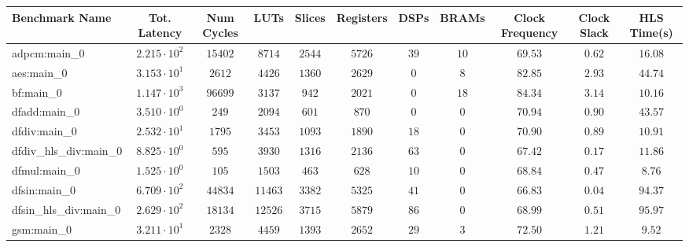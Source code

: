\begin{tabular}{|l|c|c|c|c|c|c|c|c|c|c|}
\hline
Benchmark Name          & Tot. Latency           & Num Cycles & LUTs      & Slices    & Registers & DSPs    & BRAMs   & Clock Frequency & Clock Slack & HLS Time(s) \\
\hline
adpcm:main\_0           & $ 2.215 \cdot 10^{2} $ & $ 15402  $ & $ 8714  $ & $ 2544  $ & $ 5726  $ & $ 39  $ & $ 10  $ & $ 69.53       $ & $ 0.62    $ & $ 16.08   $ \\
aes:main\_0             & $ 3.153 \cdot 10^{1} $ & $ 2612   $ & $ 4426  $ & $ 1360  $ & $ 2629  $ & $ 0   $ & $ 8   $ & $ 82.85       $ & $ 2.93    $ & $ 44.74   $ \\
bf:main\_0              & $ 1.147 \cdot 10^{3} $ & $ 96699  $ & $ 3137  $ & $ 942   $ & $ 2021  $ & $ 0   $ & $ 18  $ & $ 84.34       $ & $ 3.14    $ & $ 10.16   $ \\
dfadd:main\_0           & $ 3.510 \cdot 10^{0} $ & $ 249    $ & $ 2094  $ & $ 601   $ & $ 870   $ & $ 0   $ & $ 0   $ & $ 70.94       $ & $ 0.90    $ & $ 43.57   $ \\
dfdiv:main\_0           & $ 2.532 \cdot 10^{1} $ & $ 1795   $ & $ 3453  $ & $ 1093  $ & $ 1890  $ & $ 18  $ & $ 0   $ & $ 70.90       $ & $ 0.89    $ & $ 10.91   $ \\
dfdiv\_hls\_div:main\_0 & $ 8.825 \cdot 10^{0} $ & $ 595    $ & $ 3930  $ & $ 1316  $ & $ 2136  $ & $ 63  $ & $ 0   $ & $ 67.42       $ & $ 0.17    $ & $ 11.86   $ \\
dfmul:main\_0           & $ 1.525 \cdot 10^{0} $ & $ 105    $ & $ 1503  $ & $ 463   $ & $ 628   $ & $ 10  $ & $ 0   $ & $ 68.84       $ & $ 0.47    $ & $ 8.76    $ \\
dfsin:main\_0           & $ 6.709 \cdot 10^{2} $ & $ 44834  $ & $ 11463 $ & $ 3382  $ & $ 5325  $ & $ 41  $ & $ 0   $ & $ 66.83       $ & $ 0.04    $ & $ 94.37   $ \\
dfsin\_hls\_div:main\_0 & $ 2.629 \cdot 10^{2} $ & $ 18134  $ & $ 12526 $ & $ 3715  $ & $ 5879  $ & $ 86  $ & $ 0   $ & $ 68.99       $ & $ 0.51    $ & $ 95.97   $ \\
gsm:main\_0             & $ 3.211 \cdot 10^{1} $ & $ 2328   $ & $ 4459  $ & $ 1393  $ & $ 2652  $ & $ 29  $ & $ 3   $ & $ 72.50       $ & $ 1.21    $ & $ 9.52    $ \\

\end{tabular}
